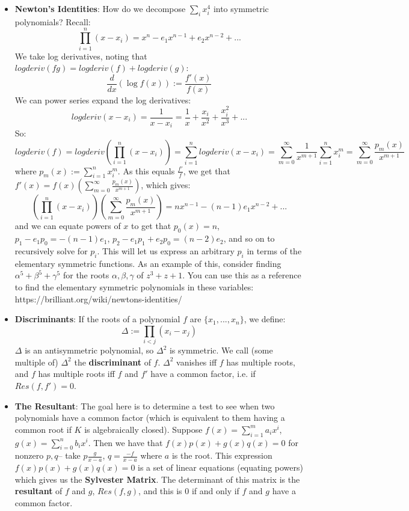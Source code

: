 \documentclass[11pt, oneside]{amsart}   	%
\theoremstyle{definition}
\begin{document}
\begin{itemize}

	\item \textbf{Newton's Identities}: How do we decompose $\sum_ix_i^4$ into symmetric polynomials? Recall:
	$$
		\prod_{i = 1}^n(x - x_i) = x^n - e_1x^{n - 1} + e_2 x^{n - 2} + ...
	$$
	We take log derivatives, noting that $logderiv(fg) = logderiv(f) + logderiv(g)$:
	$$
		\frac{d}{dx}(\log f(x)) := \frac{f'(x)}{f(x)}
	$$
	We can power series expand the log derivatives:
	$$
		logderiv(x - x_i) = \frac{1}{x - x_i} = \frac{1}{x} + \frac{x_i}{x^2} + \frac{x_i^2}{x^3} + ...
	$$
	So:
	$$
		logderiv(f) = logderiv(\prod_{i = 1}^n(x - x_i)) = \sum_{i = 1}^nlogderiv(x - x_i) = \sum_{m = 0}^\infty\frac{1}{x^{m + 1}}\sum_{i = 1}^nx_i^m
		= \sum_{m = 0}^\infty \frac{p_m(x)}{x^{m + 1}}
	$$
	where $p_m(x) := \sum_{i = 1}^nx_i^m$. As this equals $\frac{f'}{f}$, we get that $f'(x) = f(x)(\sum_{m = 0}^\infty \frac{p_m(x)}{x^{m + 1}})$, which 
	gives:
	$$
		(\prod_{i = 1}^n(x - x_i))(\sum_{m = 0}^\infty \frac{p_m(x)}{x^{m + 1}}) = nx^{n - 1} - (n - 1)e_1x^{n - 2} + ...
	$$
	and we can equate powers of $x$ to get that $p_0(x) = n$, $p_1 - e_1p_0 = -(n - 1)e_1$, $p_2 - e_1p_1 + e_2p_0 = (n - 2) e_2$, and so on to 
	recursively solve for $p_i$. This will let us express an arbitrary $p_i$ in terms of the elementary symmetric functions. As an example of this, 
	consider finding $\alpha^5 + \beta^5 + \gamma^5$ for the roots $\alpha, \beta, \gamma$ of $z^3 + z + 1$. You can use this as a reference to 
	find the elementary symmetric polynomials in these variables: https://brilliant.org/wiki/newtons-identities/
	
	\item \textbf{Discriminants}: If the roots of a polynomial $f$ are $\{x_1, ..., x_n\}$, we define:
	$$
		\Delta := \prod_{i < j}(x_i - x_j)
	$$
	$\Delta$ is an antisymmetric polynomial, so $\Delta^2$ is symmetric. We call (some multiple of) $\Delta^2$ the \textbf{discriminant} of $f$. 
	$\Delta^2$ vanishes iff $f$ has multiple roots, and $f$ has multiple roots iff $f$ and $f'$ have a common factor, i.e. if $Res(f, f') = 0$.
	
	\item \textbf{The Resultant}: The goal here is to determine a test to see when two polynomials have a common factor (which is equivalent to them 
	having a common root if $K$ is algebraically closed). Suppose $f(x) = \sum_{i = 1}^ma_ix^i$, $g(x) = \sum_{i = 0}^nb_ix^i$. Then we have that 
	$f(x)p(x) + g(x)q(x) = 0$ for nonzero $p, q$-- take $p \frac{g}{x - a}$, $q = \frac{-f}{x - a}$ where $a$ is the root. This expression $f(x)p(x) + g(x)
	q(x) = 0$ is a set of linear equations (equating powers) which gives us the \textbf{Sylvester Matrix}. The determinant of this matrix is the 
	\textbf{resultant} of $f$ and $g$, $Res(f, g)$, and this is 0 if and only if $f$ and $g$ have a common factor.
	

\end{itemize}
\end{document}

